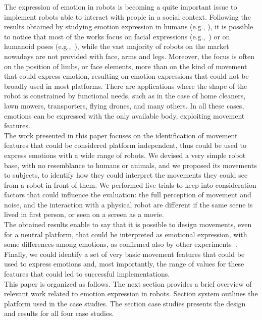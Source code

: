 The expression of emotion in robots is becoming a quite important issue to implement robots able to interact with people in a social context. Following the results obtained by studying emotion expression in humans (e.g., \cite{Venture2014,Ekman2004}), it is possible to notice that most of the works focus on facial expressions (e.g.,~\cite{Breazeal2002}) or on humanoid poses (e.g.,~\cite{Canamero2010}), while the vast majority of robots on the market nowadays are not provided with face, arms and legs. Moreover, the focus is often on the position of limbs, or face elements, more than on the kind of movement that could express emotion, resulting on emotion expressions that could not be broadly used in most platforms.
There are applications where the shape of the robot is constrained by functional needs, such as in the case of home cleaners, lawn mowers, transporters, flying drones, and many others. In all these cases, emotions can be expressed with the only available body, exploiting movement features.
\\
The work presented in this paper focuses on the identification of movement features that could be considered platform independent, thus could be used to express emotions with a wide range of robots. We devised a very simple robot base, with no resemblance to humans or animals, and we proposed its movements to subjects, to identify how they could interpret the movements they could see from a robot in front of them. We performed live trials to keep into consideration factors that could influence the evaluation: the full perception of movement and noise, and the interaction with a physical robot are different if the same scene is lived in first person, or seen on a screen as a movie.
\\
The obtained results enable to say that it is possible to design movements, even for a neutral platform, that could be interpreted as emotional expression, with some differences among emotions, as confirmed also by other experiments~\cite{Sharma2013}.
\\
Finally, we could identify a set of very basic movement features that could be used to express emotions and, most importantly, the range of values for these features that could led to successful implementations.
\\
This paper is organized as follows. The next section provides a brief overview of relevant work related to emotion expression in robots. Section system outlines the platform used in the case studies. The section case studies presents the design and results for all four case studies.